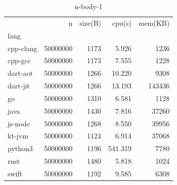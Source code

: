 \begin{table}[ht]
    \caption{n-body-1}
    \label{tab:n-body-1}
    \begin{center}
        \begin{tabular}{lrrrr}
            \toprule
            {}        & n        & size(B) & cpu(s)  & mem(KB) \\
            lang      &          &         &         &         \\
            \midrule
            cpp-clang & 50000000 & 1173    & 5.926   & 1236    \\
            cpp-gcc   & 50000000 & 1173    & 7.555   & 1228    \\
            dart-aot  & 50000000 & 1266    & 10.220  & 9308    \\
            dart-jit  & 50000000 & 1266    & 13.193  & 143436  \\
            go        & 50000000 & 1310    & 6.581   & 1128    \\
            java      & 50000000 & 1430    & 7.816   & 37260   \\
            js-node   & 50000000 & 1268    & 8.550   & 39956   \\
            kt-jvm    & 50000000 & 1124    & 6.914   & 37068   \\
            python3   & 50000000 & 1196    & 541.319 & 7780    \\
            rust      & 50000000 & 1480    & 5.818   & 1024    \\
            swift     & 50000000 & 1192    & 9.585   & 6308    \\
            \bottomrule
        \end{tabular}
    \end{center}
\end{table}


